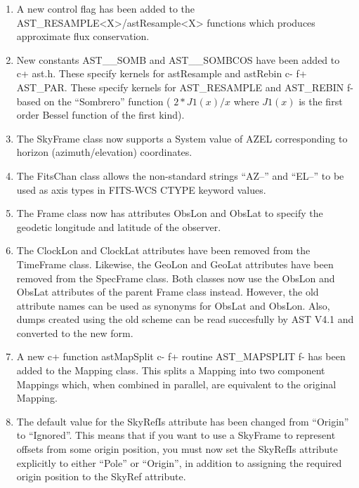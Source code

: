 \documentclass[twoside,11pt]{article}
\begin{document}
\begin{enumerate}

\item A new control flag has been added to the AST\_RESAMPLE<X>/astResample<X>
functions which produces approximate flux conservation.

\item New constants AST\_\_SOMB and AST\_\_SOMBCOS have been added to
c+
ast.h. These specify kernels for astResample and astRebin
c-
f+
AST\_PAR. These specify kernels for AST\_RESAMPLE and AST\_REBIN
f-
based on the ``Sombrero'' function ( $2*J1(x)/x$ where $J1(x)$ is the
first order Bessel function of the first kind).

\item The SkyFrame class now supports a System value of AZEL corresponding
to horizon (azimuth/elevation) coordinates.

\item The FitsChan class allows the non-standard strings ``AZ--'' and
``EL--'' to be used as axis types in FITS-WCS CTYPE keyword values.

\item The Frame class now has attributes ObsLon and ObsLat to specify
the geodetic longitude and latitude of the observer.

\item The ClockLon and ClockLat attributes have been removed from the
TimeFrame class. Likewise, the GeoLon and GeoLat attributes have been
removed from the SpecFrame class. Both classes now use the ObsLon and
ObsLat attributes of the parent Frame class instead. However, the old
attribute names can be used as synonyms for ObsLat and ObsLon. Also,
dumps created using the old scheme can be read succesfully by AST V4.1
and converted to the new form.

\item A new
c+
function astMapSplit
c-
f+
routine AST\_MAPSPLIT
f-
has been added to the Mapping class. This splits a Mapping into two component
Mappings which, when combined in parallel, are equivalent to the original
Mapping.

\item The default value for the SkyRefIs attribute has been changed from
``Origin'' to ``Ignored''. This means that if you want to use a SkyFrame
to represent offsets from some origin position, you must now set the
SkyRefIs attribute explicitly to either ``Pole'' or ``Origin'', in
addition to assigning the required origin position to the SkyRef attribute.

\end{enumerate}
\end{document}
